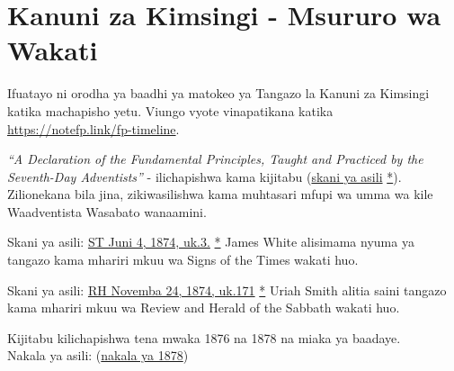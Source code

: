 \section*{Kanuni za Kimsingi - Msururo wa Wakati} \label{appendix:timeline}

Ifuatayo ni orodha ya baadhi ya matokeo ya Tangazo la Kanuni za Kimsingi katika machapisho yetu. Viungo vyote vinapatikana katika \href{https://notefp.link/fp-timeline}{https://notefp.link/fp-timeline}.


\textit{“A Declaration of the Fundamental Principles, Taught and Practiced by the Seventh-Day Adventists”} - ilichapishwa kama kijitabu (\href{https://adventistdigitallibrary.org/islandora/object/adl:366607?link_only=true}{skani ya asili} \href{https://forgotten-pillar.s3.us-east-2.amazonaws.com/A+declaration+of+the+fundamental+principles+taught+and+practiced+by+the+Seventh-day+Adventists++.pdf}{*}). Zilionekana bila jina, zikiwasilishwa kama muhtasari mfupi wa umma wa kile Waadventista Wasabato wanaamini.


Skani ya asili: \href{https://adventistdigitallibrary.org/adl-364148/signs-times-june-4-1874}{ST Juni 4, 1874, uk.3.} \href{https://forgotten-pillar.s3.us-east-2.amazonaws.com/Signs+of+the+Times+_+June+4%2C+1874++.pdf}{*} James White alisimama nyuma ya tangazo kama mhariri mkuu wa Signs of the Times wakati huo.


Skani ya asili: \href{https://documents.adventistarchives.org/Periodicals/RH/RH18741124-V44-22.pdf}{RH Novemba 24, 1874, uk.171} \href{https://forgotten-pillar.s3.us-east-2.amazonaws.com/RH18741124-V44-22.pdf}{*} Uriah Smith alitia saini tangazo kama mhariri mkuu wa Review and Herald of the Sabbath wakati huo.


Kijitabu kilichapishwa tena mwaka 1876 na 1878 na miaka ya baadaye. \\
Nakala ya asili: (\href{https://adventistdigitallibrary.org/islandora/object/adl%3A22250872?solr_nav%5Bid%5D=a09d3902c2540c98eb7f&solr_nav%5Bpage%5D=56&solr_nav%5Boffset%5D=3}{nakala ya 1878})



